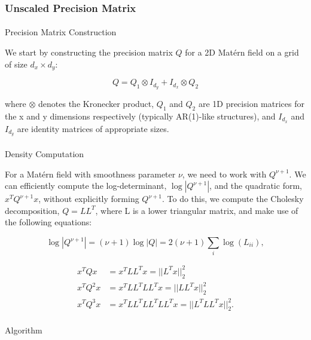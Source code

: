 \documentclass[journal=,manuscript=]{achemso}
\makeatletter
\let\oldparagraph\paragraph
\renewcommand{\paragraph}{
    \@ifstar
      \xxxParagraphStar
      \xxxParagraphNoStar
  }
\newcommand{\xxxParagraphStar}[1]{\oldparagraph*{#1}\mbox{}}
\newcommand{\xxxParagraphNoStar}[1]{\oldparagraph{#1}\mbox{}}
\makeatother
\begin{document}
\subsubsection{Unscaled Precision
Matrix}\label{unscaled-precision-matrix}

\paragraph{Precision Matrix
Construction}\label{precision-matrix-construction}

We start by constructing the precision matrix \(Q\) for a 2D Matérn
field on a grid of size \(d_x \times d_y\):

\[
Q = Q_1 \otimes I_{d_y} + I_{d_x} \otimes Q_2 
\]

where \(\otimes\) denotes the Kronecker product, \(Q_1\) and \(Q_2\) are
1D precision matrices for the x and y dimensions respectively (typically
AR(1)-like structures), and \(I_{d_x}\) and \(I_{d_y}\) are identity
matrices of appropriate sizes.

\paragraph{Density Computation}\label{density-computation}

For a Matérn field with smoothness parameter \(\nu\), we need to work
with \(Q^{\nu+1}\). We can efficiently compute the log-determinant,
\(\log|Q^{\nu+1}|\), and the quadratic form, \(x^T Q^{\nu+1} x\),
without explicitly forming \(Q^{\nu+1}\). To do this, we compute the
Cholesky decomposition, \(Q = LL^T\), where L is a lower triangular
matrix, and make use of the following equations:

\[
\log|Q^{\nu+1}| = (\nu+1)\log|Q| = 2(\nu+1)\sum_{i}\log(L_{ii}), 
\]

\[
\begin{aligned}
x^T Q x &= x^T L L^T x = ||L^T x||_2^2 \\
x^T Q^2 x &=  x^T L L^T L L^T x = ||LL^T x||_2^2 \\
x^T Q^3 x &=  x^T L L^T L L^T L L^T x = ||L^TLL^T x||_2^2.
\end{aligned}
\]

\paragraph{Algorithm}\label{algorithm}
\end{document}

